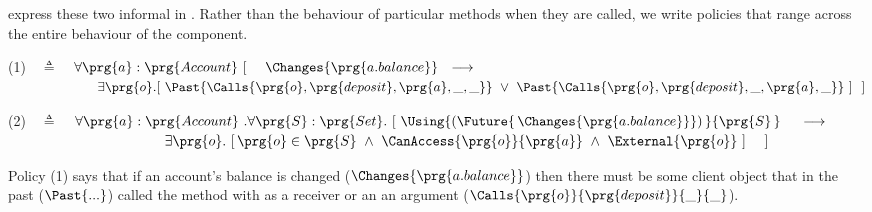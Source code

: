  express these two informal  %
in \Chainmail.  Rather than %
 the behaviour of particular methods when they are called, we
write policies 
{}  that range across the entire behaviour of the
component.
\vspace{.2cm}


(1)\ \  $\triangleq$\ \ $\forall \prg{a}:\prg{Account}\ [\ \ \ \  \Changes{\prg{a.balance}}  \ \    
    \longrightarrow \ \    \hfill$ \\
  $\strut \hspace{2.3cm} 
 \exists \prg{o}. [\  \Past{\Calls{\prg{o},\prg{deposit},\prg{a},\_,\_}}\ \vee\  \Past{\Calls{\prg{o},\prg{deposit},\_,\prg{a},\_}} \ ] \ \ ] \hfill $

\vspace{.4cm}

    (2)\ \  $\triangleq$\ \ $\forall \prg{a}:\prg{Account}\ .\forall \prg{S}:\prg{Set}.\ [  \ \Using{(\Future{\,\Changes{\prg{a.balance}}})\,}{\prg{S}\,}\ \ \   \
    \longrightarrow$ \\
 $\strut \hspace{3.9cm} \hfill \exists \prg{o}.\ [\, \prg{o}\in \prg{S}\ \wedge \ \CanAccess{\prg{o}}{\prg{a}}\ \wedge  \  \External{\prg{o}}  \ ] \ \ \ \ ]$

\vspace{.2cm}

{}
 
Policy (1) %
says that if   an account's balance is changed
($\Changes{\prg{a.balance}}$)
then there must be some client object \prg{o}
that in the past (${\Past{...}}$) called the  method with  as a receiver or an an argument 
($\Calls{\prg{o}} {\prg{deposit}} {\_} {\_}$).
{}
{}

